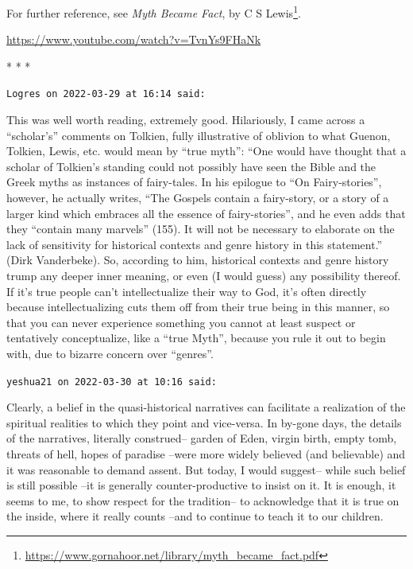 For further reference, see \textit{Myth Became Fact}, by C S Lewis\footnote{\url{https://www.gornahoor.net/library/myth_became_fact.pdf}}.

\url{https://www.youtube.com/watch?v=TvnYs9FHaNk} 


\begin{center}* * *\end{center}

\begin{footnotesize}
\begin{sffamily}
\texttt{Logres on 2022-03-29 at 16:14 said:}

This was well worth reading, extremely good. Hilariously, I came across a ``scholar's'' comments on Tolkien, fully illustrative of oblivion to what Guenon, Tolkien, Lewis, etc. would mean by ``true myth'': ``One would have thought that a scholar of Tolkien's standing could not possibly have seen the Bible and the Greek myths as instances of fairy-tales. In his epilogue to ``On Fairy-stories'', however, he actually writes, ``The Gospels contain a fairy-story, or a story of a larger kind which embraces all the essence of fairy-stories'', and he even adds that they ``contain many marvels'' (155). It will not be necessary to elaborate on the lack of sensitivity for historical contexts and genre history in this statement.'' (Dirk Vanderbeke). So, according to him, historical contexts and genre history trump any deeper inner meaning, or even (I would guess) any possibility thereof. If it's true people can't intellectualize their way to God, it's often directly because intellectualizing cuts them off from their true being in this manner, so that you can never experience something you cannot at least suspect or tentatively conceptualize, like a ``true Myth'', because you rule it out to begin with, due to bizarre concern over ``genres''.

\hfill

\texttt{yeshua21 on 2022-03-30 at 10:16 said:}

Clearly, a belief in the quasi-historical narratives can facilitate a realization of the spiritual realities to which they point and vice-versa. In by-gone days, the details of the narratives, literally construed-- garden of Eden, virgin birth, empty tomb, threats of hell, hopes of paradise --were more widely believed (and believable) and it was reasonable to demand assent. But today, I would suggest-- while such belief is still possible --it is generally counter-productive to insist on it. It is enough, it seems to me, to show respect for the tradition-- to acknowledge that it is true on the inside, where it really counts --and to continue to teach it to our children.


\end{sffamily}
\end{footnotesize}
